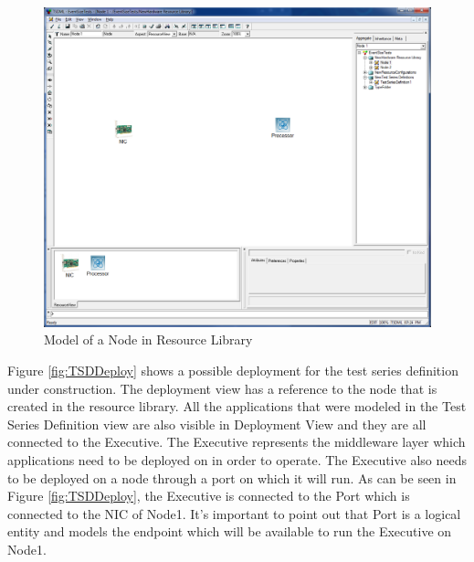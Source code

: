 \begin{figure}
	\centering
		\includegraphics[width=1.00\textwidth]{figures/TSDNode.png}
	\caption{Model of a Node in Resource Library}
	\label{fig:TSDNode}
\end{figure}

Figure \ref{fig:TSDDeploy} shows a possible deployment for the test series definition under construction. The deployment view has a reference to the node that is created in the resource library. All the applications that were modeled in the Test Series Definition view are also visible in Deployment View and they are all connected to the Executive. The Executive represents the middleware layer which applications need to be deployed on in order to operate. The Executive also needs to be deployed on a node through a port on which it will run. As can be seen in Figure \ref{fig:TSDDeploy}, the Executive is connected to the Port which is connected to the NIC of Node1. It's important to point out that Port is a logical entity and models the endpoint which will be available to run the Executive on Node1.

